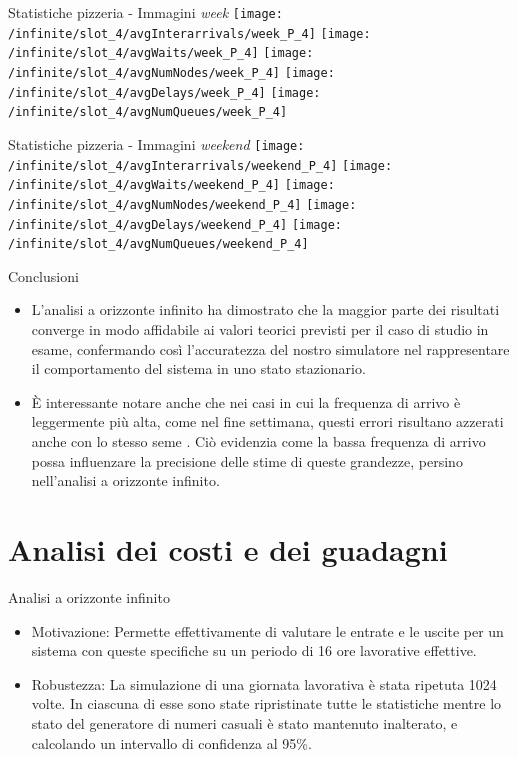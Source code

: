 \documentclass[xcolor=table]{beamer}
\newcommand{\key}[1]{\texttt{\StrSubstitute{#1}{_}{\_}}}
\begin{document}
\begin{frame}{Statistiche pizzeria - Immagini \textit{week}}\justifying
\centering
\texttt{[image: /infinite/slot\_4/avgInterarrivals/week\_P\_4]}
\texttt{[image: /infinite/slot\_4/avgWaits/week\_P\_4]}
\texttt{[image: /infinite/slot\_4/avgNumNodes/week\_P\_4]}
\texttt{[image: /infinite/slot\_4/avgDelays/week\_P\_4]}
\texttt{[image: /infinite/slot\_4/avgNumQueues/week\_P\_4]}
\end{frame}
\begin{frame}{Statistiche pizzeria - Immagini \textit{weekend}}\justifying
\centering
\texttt{[image: /infinite/slot\_4/avgInterarrivals/weekend\_P\_4]}
\texttt{[image: /infinite/slot\_4/avgWaits/weekend\_P\_4]}
\texttt{[image: /infinite/slot\_4/avgNumNodes/weekend\_P\_4]}
\texttt{[image: /infinite/slot\_4/avgDelays/weekend\_P\_4]}
\texttt{[image: /infinite/slot\_4/avgNumQueues/weekend\_P\_4]}
\end{frame}




\begin{frame}{Conclusioni}\justifying
\begin{itemize}
\item L'analisi a orizzonte infinito ha dimostrato che la maggior parte dei risultati converge in modo affidabile ai valori teorici previsti per il caso di studio in esame, confermando così l'accuratezza del nostro simulatore nel rappresentare il comportamento del sistema in uno stato stazionario.

\item È interessante notare anche che nei casi in cui la frequenza di arrivo è leggermente più alta, come nel fine settimana, questi errori risultano azzerati anche con lo stesso seme \key{123}. Ciò evidenzia come la bassa frequenza di arrivo possa influenzare la precisione delle stime di queste grandezze, persino nell'analisi a orizzonte infinito. 
\end{itemize}
\end{frame}

\section{Analisi dei costi e dei guadagni}

\begin{frame}{Analisi a orizzonte infinito}\justifying
\begin{itemize}
\item Motivazione: Permette effettivamente di valutare le entrate e le uscite per un sistema con queste specifiche su un periodo di 16 ore lavorative effettive. 

\item Robustezza: La simulazione di una giornata lavorativa è stata ripetuta 1024 volte. In ciascuna di esse sono state ripristinate tutte le statistiche
mentre lo stato del generatore di numeri casuali è stato mantenuto inalterato, e calcolando un intervallo di confidenza al 95\%.  
\end{itemize}
\end{frame}
\end{document}
